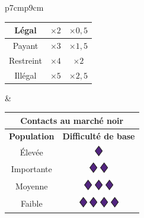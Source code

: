 \documentclass{article}
\begin{document}
\begin{tabular}{p{7cm}p{9cm}}
\begin{tabular}{|c|c|c|}
		\hline 
		Légal & $\times2$ & $\times0,5$ \\ 
		\hline 
		Payant & $\times3$ & $\times1,5$ \\ 
		\hline 
		Restreint & $\times4$ & $\times2$ \\ 
		\hline 
		Illégal & $\times5$ & $\times2,5$ \\ 
		\hline 
	\end{tabular} & \begin{tabular}{|c|c|}
						\hline 
						\multicolumn{2}{|c|}{\cellcolor{DarkRed} \textbf{{\large \textcolor{PureWhite}{Contacts au marché noir}}}} \\ 
						\hline 
						\cellcolor{DarkGold}\textbf{Population} & \cellcolor{DarkGold}\textbf{Difficulté de base} \\ 
						\hline 
						Élevée & {\Large \includegraphics[height=\fontcharht\font`\B]{../img/dice_purple}} \\ 
						\hline 
						Importante & {\Large \includegraphics[height=\fontcharht\font`\B]{../img/dice_purple}} {\Large \includegraphics[height=\fontcharht\font`\B]{../img/dice_purple}} \\ 
						\hline 
						Moyenne & {\Large \includegraphics[height=\fontcharht\font`\B]{../img/dice_purple}} {\Large \includegraphics[height=\fontcharht\font`\B]{../img/dice_purple}} {\Large \includegraphics[height=\fontcharht\font`\B]{../img/dice_purple}} \\ 
						\hline 
						Faible & {\Large \includegraphics[height=\fontcharht\font`\B]{../img/dice_purple}} {\Large \includegraphics[height=\fontcharht\font`\B]{../img/dice_purple}} {\Large \includegraphics[height=\fontcharht\font`\B]{../img/dice_purple}} {\Large \includegraphics[height=\fontcharht\font`\B]{../img/dice_purple}} \\ 

\end{tabular}
\end{tabular}
\end{document}
